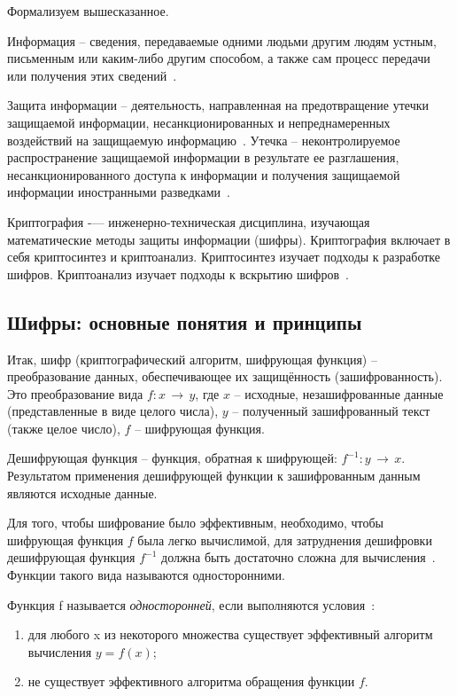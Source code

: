Формализуем вышесказанное.

Информация – сведения, передаваемые одними людьми другим людям устным, письменным или каким-либо другим способом, а также сам процесс передачи или получения этих сведений~\cite{src9}.

Защита информации – деятельность, направленная на предотвращение утечки защищаемой информации, несанкционированных и непреднамеренных воздействий на защищаемую информацию~\cite{src10}. Утечка – неконтролируемое распространение защищаемой информации в результате ее разглашения, несанкционированного доступа к информации и получения защищаемой информации иностранными разведками~\cite{src11}.

Криптография -— инженерно-техническая дисциплина, изучающая математические методы защиты информации (шифры). Криптография включает в себя криптосинтез и криптоанализ. Криптосинтез изучает подходы к разработке шифров. Криптоанализ изучает подходы к вскрытию шифров~\cite{src8}.

\subsection{Шифры: основные понятия и принципы} %

Итак, шифр (криптографический алгоритм, шифрующая функция) – преобразование данных, обеспечивающее их защищённость (зашифрованность). Это преобразование вида $f:x\,\to\,y$, где $x$ – исходные, незашифрованные данные (представленные в виде целого числа), $y$ – полученный зашифрованный текст (также целое число), $f$ – шифрующая функция.

Дешифрующая функция – функция, обратная к шифрующей: $f^{-1}:y\,\to\,x$. Результатом применения дешифрующей функции к зашифрованным данным являются исходные данные.

Для того, чтобы шифрование было эффективным, необходимо, чтобы шифрующая функция $f$ была легко вычислимой, для затруднения дешифровки дешифрующая функция $f^{-1}$ должна быть достаточно сложна для вычисления~\cite{src12}. Функции такого вида называются односторонними.

Функция f называется \textit{односторонней}, если выполняются условия~\cite{src12}:
\begin{enumerate}
	\item для любого x из некоторого множества существует эффективный алгоритм вычисления $y=f(x)$;
	\item не существует эффективного алгоритма обращения функции $f$.
\end{enumerate}  

